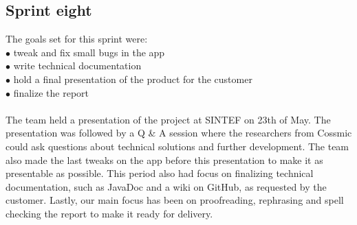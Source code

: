 \subsection{Sprint eight}
The goals set for this sprint were:\\
$\bullet$\hspace{0.25cm} tweak and fix small bugs in the app\\
$\bullet$\hspace{0.25cm} write technical documentation\\
$\bullet$\hspace{0.25cm} hold a final presentation of the product for the customer\\
$\bullet$\hspace{0.25cm} finalize the report\\\\
The team held a presentation of the project at SINTEF on 23th of May. The presentation was followed by a Q \& A session where the researchers from Cossmic could ask questions about technical solutions and further development. The team also made the last tweaks on the app before this presentation to make it as presentable as possible. This period also had focus on finalizing technical documentation, such as JavaDoc and a wiki on GitHub, as requested by the customer. Lastly, our main focus has been on proofreading, rephrasing and spell checking the report to make it ready for delivery.
